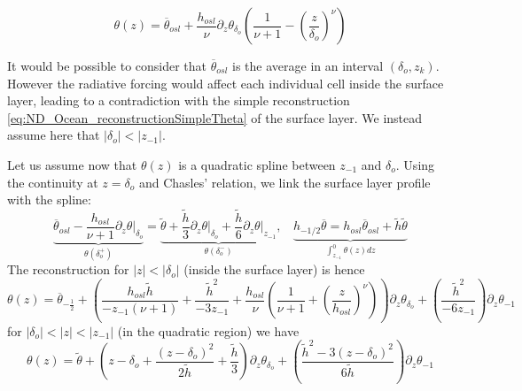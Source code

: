 \begin{equation}
    \theta(z) = \overline{\theta}_{osl} +
    \frac{h_{osl}}{\nu} \partial_z \theta_{\delta_o} \left(
    \frac{1}{\nu+1} - \left(\frac{z}{\delta_{o}}\right)^\nu
\right)
\end{equation}
\begin{remark}
It would be possible to consider that $\overline{\theta}_{osl}$ is
the average in an interval $(\delta_o, z_k)$.
However the radiative forcing would affect each individual cell
inside the surface layer, leading to a contradiction with the simple
reconstruction \eqref{eq:ND_Ocean_reconstructionSimpleTheta}
of the surface layer.
We instead assume here that $|\delta_{o}| < |z_{-1}|$.
\end{remark}
Let us assume now that  $\theta(z)$ is a quadratic spline between
$z_{-1}$ and $\delta_o$.
Using the continuity at $z=\delta_o$ and Chasles' relation,
we link the surface layer profile with the spline:
\begin{equation}
\underbrace{
    \overline{\theta}_{osl} -
    \frac{h_{osl}}{\nu+1}\left. \partial_z \theta
    \right|_{\delta_o}}_{\theta(\delta_o^{+})}
    =
    \underbrace{
    \widetilde{\theta}
    + \frac{\widetilde{h}}{3}
    \left.\partial_z \theta\right|_{\delta_o}
    + \frac{\widetilde{h}}{6}
	\left.\partial_z \theta\right|_{z_{-1}}}_{
	\theta(\delta_o^{-})}
	,
    ~~~~
	\underbrace{
    h_{-1/2} \overline{\theta} = 
    h_{osl}\overline{\theta}_{osl} +\widetilde{h}
    \widetilde{\theta}}_{
    \int_{z_{-1}}^{0}\theta(z) dz
    }
\end{equation}
The reconstruction for $|z|<|\delta_o|$ (inside the surface layer) is hence
\begin{equation}
    \theta(z) =
    \overline{\theta}_{-\frac{1}{2}}
    +
	\left(\frac{h_{osl}\widetilde{h}}{-z_{-1}(\nu+1)} +
	\frac{\widetilde{h}^2}{-3 z_{-1}}
    +
    \frac{h_{osl}}{\nu}\left(
    \frac{1}{\nu+1} + \left(\frac{z}{h_{osl}}
    \right)^\nu
    \right)\right) \partial_z \theta_{\delta_o}
    +
	\left(\frac{\widetilde{h}^2}{-6 z_{-1}}\right)
    \partial_z \theta_{-1}
\end{equation}
for $|\delta_o| < |z| < |z_{-1}|$
(in the quadratic region) we have
\begin{equation}
    \theta(z) =
        \widetilde{\theta}
        +
        \left(
        z-\delta_o + 
        \frac{(z-\delta_o)^2}{2\widetilde{h}}
        + \frac{\widetilde{h}}{3}
        \right)\partial_z \theta_{\delta_o}
        +
        \left(
        \frac{\widetilde{h}^2 - 
        3(z-\delta_o)^2}{6 \widetilde{h}}
        \right)\partial_z \theta_{-1}
\end{equation}
